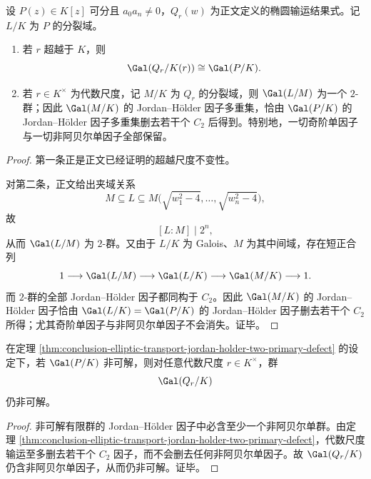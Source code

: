 \begin{theorem}\label{thm:conclusion-elliptic-transport-jordan-holder-two-primary-defect}
设 \(P(z)\in K[z]\) 可分且 \(a_0a_n\neq 0\)，\(Q_r(w)\) 为正文定义的椭圆输运结果式。记 \(L/K\) 为 \(P\) 的分裂域。
\begin{enumerate}
  \item 若 \(r\) 超越于 \(K\)，则
  \[
  \Gal(Q_r/K(r))\cong \Gal(P/K).
  \]
  \item 若 \(r\in K^\times\) 为代数尺度，记 \(M/K\) 为 \(Q_r\) 的分裂域，则 \(\Gal(L/M)\) 为一个 \(2\)-群；因此 \(\Gal(M/K)\) 的 Jordan--H{\"o}lder 因子多重集，恰由 \(\Gal(P/K)\) 的 Jordan--H{\"o}lder 因子多重集删去若干个 \(C_2\) 后得到。特别地，一切奇阶单因子与一切非阿贝尔单因子全部保留。
\end{enumerate}
\end{theorem}
\begin{proof}
第一条正是正文已经证明的超越尺度不变性。

对第二条，正文给出夹域关系
\[
M\subseteq L\subseteq M\bigl(\sqrt{w_1^2-4},\dots,\sqrt{w_n^2-4}\bigr),
\]
故
\[
[L:M]\mid 2^n,
\]
从而 \(\Gal(L/M)\) 为 \(2\)-群。又由于 \(L/K\) 为 Galois、\(M\) 为其中间域，存在短正合列
\[
1\longrightarrow \Gal(L/M)
\longrightarrow \Gal(L/K)
\longrightarrow \Gal(M/K)
\longrightarrow 1.
\]
而 \(2\)-群的全部 Jordan--H{\"o}lder 因子都同构于 \(C_2\)。因此 \(\Gal(M/K)\) 的 Jordan--H{\"o}lder 因子恰由 \(\Gal(L/K)=\Gal(P/K)\) 的 Jordan--H{\"o}lder 因子删去若干个 \(C_2\) 所得；尤其奇阶单因子与非阿贝尔单因子不会消失。证毕。
\end{proof}

\begin{corollary}[非可解性在代数尺度下不可被二值输运洗去]\label{cor:conclusion-elliptic-transport-nonsolvability-persists}
在定理 \ref{thm:conclusion-elliptic-transport-jordan-holder-two-primary-defect} 的设定下，若 \(\Gal(P/K)\) 非可解，则对任意代数尺度 \(r\in K^\times\)，群
\[
\Gal(Q_r/K)
\]
仍非可解。
\end{corollary}
\begin{proof}
非可解有限群的 Jordan--H{\"o}lder 因子中必含至少一个非阿贝尔单群。由定理 \ref{thm:conclusion-elliptic-transport-jordan-holder-two-primary-defect}，代数尺度输运至多删去若干个 \(C_2\) 因子，而不会删去任何非阿贝尔单因子。故 \(\Gal(Q_r/K)\) 仍含非阿贝尔单因子，从而仍非可解。证毕。
\end{proof}

